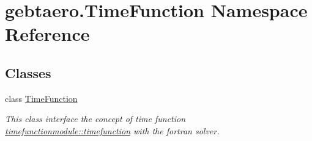 \hypertarget{namespacegebtaero_1_1_time_function}{}\section{gebtaero.\+Time\+Function Namespace Reference}
\label{namespacegebtaero_1_1_time_function}
\subsection*{Classes}
\begin{DoxyCompactItemize}
\item 
class \hyperlink{classgebtaero_1_1_time_function_1_1_time_function}{Time\+Function}
\begin{DoxyCompactList}\small\item\em This class interface the concept of time function \hyperlink{structtimefunctionmodule_1_1timefunction}{timefunctionmodule\+::timefunction} with the fortran solver. \end{DoxyCompactList}\end{DoxyCompactItemize}
